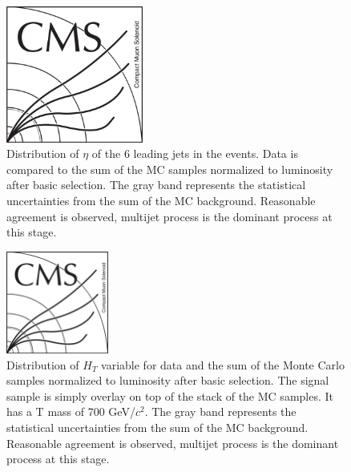 \begin{figure}[!Hhtbp]
\begin{center}
    \includegraphics[width=0.4\textwidth]{figs/CMSlogo.png}
    \caption{Distribution of $\eta$ of the 6 leading jets in
      the events. Data is compared to the sum of the MC samples
      normalized to luminosity after
      basic selection. The gray band represents the statistical
      uncertainties from the sum of the MC background. Reasonable agreement is observed, multijet process is the dominant process at this stage.}
    \label{fig:6jeta}
  \end{center}
\end{figure}\clearpage

\begin{figure}[!Hhtbp]
  \begin{center}
    \includegraphics[width=0.3\textwidth]{figs/CMSlogo.png}
    \caption{Distribution of $H_{T}$ variable for data and the sum of
      the Monte Carlo samples normalized to luminosity after basic selection. The signal sample
      is simply overlay on top of the stack of the MC samples. It has a T mass of 700 GeV/$c^{2}$. The gray band represents the statistical uncertainties from the sum of the MC background. Reasonable agreement is observed, multijet process is the dominant process at this stage.}
    \label{fig:HT}
  \end{center}
\end{figure}\clearpage

